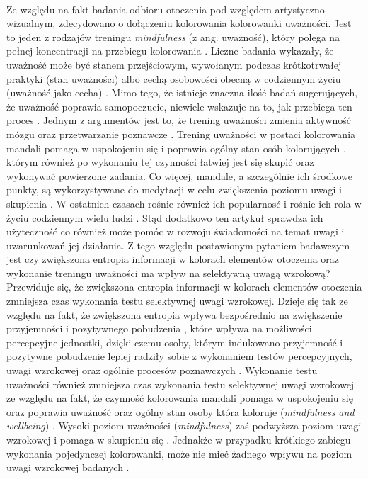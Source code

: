 \documentclass[12pt,a4paper,final,oneside,onecolumn,titlepage]{article}
\begin{document}
\paragraph{}
Ze względu na fakt badania odbioru otoczenia pod względem artystyczno-wizualnym, zdecydowano o dołączeniu kolorowania kolorowanki uważności. Jest to jeden z rodzajów treningu \textit{mindfulness} (z ang. uważność), który polega na pełnej koncentracji na przebiegu kolorowania \citep{zejmo_praktyka_2022}. Liczne badania wykazały, że uważność może być stanem przejściowym, wywołanym podczas krótkotrwałej praktyki (stan uważności) albo cechą osobowości obecną w codziennym życiu (uważność jako cecha) \citep{kiken_state_2015}. Mimo tego, że istnieje znaczna ilość badań sugerujących, że uważność poprawia samopoczucie, niewiele wskazuje na to, jak przebiega ten proces \citep{holzel_how_2011}. Jednym z argumentów jest to, że trening uważności zmienia aktywność mózgu \citep{gotink_8-week_2016} oraz przetwarzanie poznawcze \citep{zeidan_mindfulness_2010}. Trening uważności w postaci kolorowania mandali pomaga w uspokojeniu się i poprawia ogólny stan osób kolorujących \citep{carsley_effectiveness_2018, campenni_effects_2020}, którym również po wykonaniu tej czynności łatwiej jest się skupić oraz wykonywać powierzone zadania. Co więcej, mandale, a szczególnie ich środkowe punkty, są wykorzystywane do medytacji w celu zwiększenia poziomu uwagi i skupienia \citep{shankar_effectiveness_2020}. W ostatnich czasach rośnie również ich popularnosć i rośnie ich rola w życiu codziennym wielu ludzi \citep{dresler_doing_2019}. Stąd dodatkowo ten artykuł sprawdza ich użyteczność co również może pomóc w rozwoju świadomości na temat uwagi i uwarunkowań jej działania. Z tego względu postawionym pytaniem badawczym jest czy zwiększona entropia informacji w kolorach elementów otoczenia oraz wykonanie treningu uważności ma wpływ na selektywną uwagą wzrokową? Przewiduje się, że zwiększona entropia informacji w kolorach elementów otoczenia zmniejsza czas wykonania testu selektywnej uwagi wzrokowej. Dzieje się tak ze względu na fakt, że zwiększona entropia wpływa bezpośrednio na zwiększenie przyjemności i pozytywnego pobudzenia \citep{stamps_entropy_2004, stamps_entropy_2002}, które wpływa na możliwości percepcyjne jednostki, dzięki czemu osoby, którym indukowano przyjemność i pozytywne pobudzenie lepiej radziły sobie z wykonaniem testów percepcyjnych, uwagi wzrokowej oraz ogólnie procesów poznawczych \citep{mcconnell_upbeat_2011, gavazzi_pleasure_2021}. Wykonanie testu uważności również zmniejsza czas wykonania testu selektywnej uwagi wzrokowej ze względu na fakt, że czynność kolorowania mandali pomaga w uspokojeniu się oraz poprawia uważność oraz ogólny stan osoby która koloruje (\textit{mindfulness and wellbeing}) \citep{carsley_effectiveness_2018, campenni_effects_2020}. Wysoki poziom uważności (\textit{mindfulness}) zaś podwyższa poziom uwagi wzrokowej i pomaga w skupieniu się \citep{campillo_effects_2018, sumantry_meditation_2021}. Jednakże w przypadku krótkiego zabiegu - wykonania pojedynczej kolorowanki, może nie mieć żadnego wpływu na poziom uwagi wzrokowej badanych \citep{thompson_influence_2021}.
\end{document}
